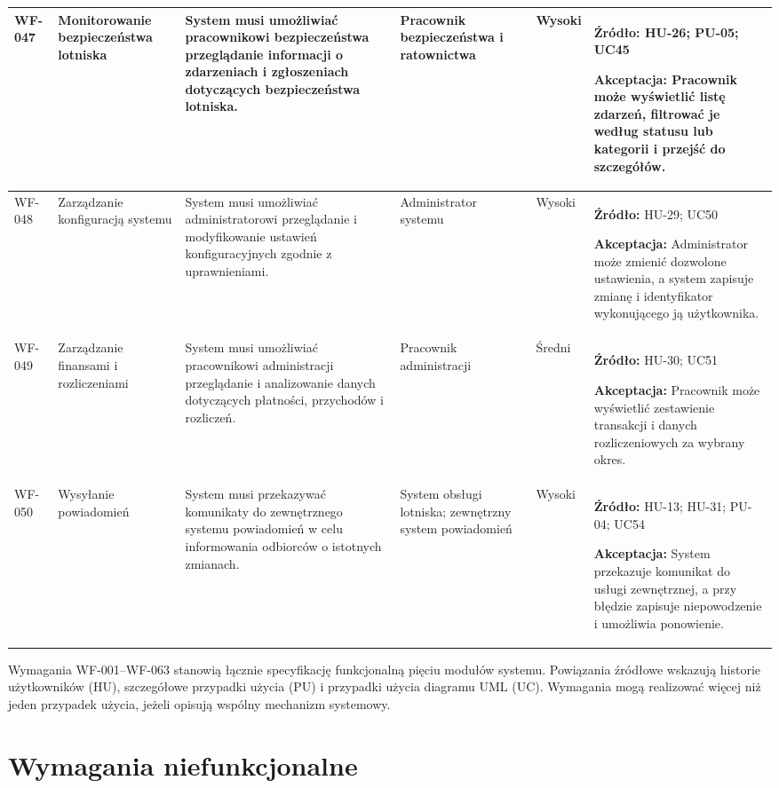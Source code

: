 \documentclass[12pt,a4paper,oneside]{report}
\begin{document}
\begin{longtable}{|p{1.05cm}|p{2.15cm}|p{3.35cm}|p{1.75cm}|p{0.95cm}|p{4.05cm}|}
WF-047 & Monitorowanie bezpieczeństwa lotniska & System musi umożliwiać pracownikowi bezpieczeństwa przeglądanie informacji o zdarzeniach i zgłoszeniach dotyczących bezpieczeństwa lotniska. & Pracownik bezpieczeństwa i ratownictwa & Wysoki & \textbf{Źródło:} HU-26; PU-05; UC45\par\textbf{Akceptacja:} Pracownik może wyświetlić listę zdarzeń, filtrować je według statusu lub kategorii i przejść do szczegółów.\\\hline
WF-048 & Zarządzanie konfiguracją systemu & System musi umożliwiać administratorowi przeglądanie i modyfikowanie ustawień konfiguracyjnych zgodnie z uprawnieniami. & Administrator systemu & Wysoki & \textbf{Źródło:} HU-29; UC50\par\textbf{Akceptacja:} Administrator może zmienić dozwolone ustawienia, a system zapisuje zmianę i identyfikator wykonującego ją użytkownika.\\\hline
WF-049 & Zarządzanie finansami i rozliczeniami & System musi umożliwiać pracownikowi administracji przeglądanie i analizowanie danych dotyczących płatności, przychodów i rozliczeń. & Pracownik administracji & Średni & \textbf{Źródło:} HU-30; UC51\par\textbf{Akceptacja:} Pracownik może wyświetlić zestawienie transakcji i danych rozliczeniowych za wybrany okres.\\\hline
WF-050 & Wysyłanie powiadomień & System musi przekazywać komunikaty do zewnętrznego systemu powiadomień w celu informowania odbiorców o istotnych zmianach. & System obsługi lotniska; zewnętrzny system powiadomień & Wysoki & \textbf{Źródło:} HU-13; HU-31; PU-04; UC54\par\textbf{Akceptacja:} System przekazuje komunikat do usługi zewnętrznej, a przy błędzie zapisuje niepowodzenie i umożliwia ponowienie.\\\hline
\end{longtable}
\normalsize

\noindent Wymagania WF-001--WF-063 stanowią łącznie specyfikację funkcjonalną pięciu modułów systemu. Powiązania źródłowe wskazują historie użytkowników (HU), szczegółowe przypadki użycia (PU) i przypadki użycia diagramu UML (UC). Wymagania mogą realizować więcej niż jeden przypadek użycia, jeżeli opisują wspólny mechanizm systemowy.

\chapter{Wymagania niefunkcjonalne}
\end{document}
